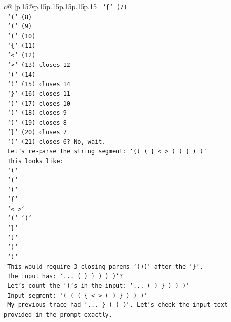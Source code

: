\documentclass{article}
\begin{document}
{\begin{supertabular}{c@{$\;$}|p{.15\linewidth}@{}p{.15\linewidth}p{.15\linewidth}p{.15\linewidth}p{.15\linewidth}p{.15\linewidth}}
{{{\texttt{        `\{` (7)} \\
\texttt{          `(` (8)} \\
\texttt{            `(` (9)} \\
\texttt{              `(` (10)} \\
\texttt{                `\{` (11)} \\
\texttt{                  `<` (12)} \\
\texttt{                  `>` (13) closes 12} \\
\texttt{                  `(` (14)} \\
\texttt{                  `)` (15) closes 14} \\
\texttt{                `\}` (16) closes 11} \\
\texttt{              `)` (17) closes 10} \\
\texttt{              `)` (18) closes 9} \\
\texttt{              `)` (19) closes 8} \\
\texttt{            `\}` (20) closes 7} \\
\texttt{          `)` (21) closes 6? No, wait.} \\
\texttt{          Let's re{-}parse the string segment: `(( ( \{ < > ( ) \} ) )`} \\
\texttt{          This looks like:} \\
\texttt{          `(`} \\
\texttt{            `(`} \\
\texttt{              `(`} \\
\texttt{                `\{`} \\
\texttt{                  `< >`} \\
\texttt{                  `(` `)`} \\
\texttt{                `\}`} \\
\texttt{              `)`} \\
\texttt{              `)`} \\
\texttt{            `)`} \\
\texttt{          This would require 3 closing parens `)))` after the `\}`.} \\
\texttt{          The input has: `... ( ) \} ) ) )`?} \\
\texttt{          Let's count the `)`s in the input: `... ( ) \} ) ) )`} \\
\texttt{          Input segment: `( ( ( \{ < > ( ) \} ) ) )`} \\
\texttt{          My previous trace had `... \} ) ) )`. Let's check the input text provided in the prompt exactly.} \\
}}}
\end{supertabular}}
\end{document}
